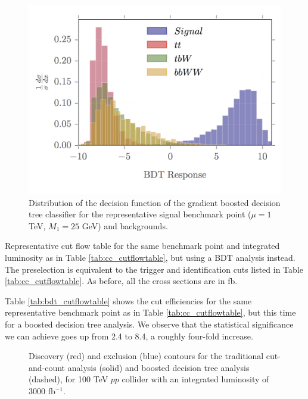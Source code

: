 \documentclass[a4paper,11pt]{article}
\begin{document}
\begin{figure}[h]
\centering
\includegraphics[trim = {0 0.5cm 0 0},clip]{images/bdt_response_png}
\caption{Distribution of the decision function of the gradient boosted decision
tree classifier for   the representative signal benchmark point ($\mu = 1$ TeV, $M_1 = 25$ GeV) and backgrounds.}
\label{fig:bdt_response}
\end{figure}

\begin{table}[h]
  \centering
  
  \caption{Representative cut flow table for the same benchmark point and
    integrated luminosity as in Table \ref{tab:cc_cutflowtable}, but using a BDT  analysis instead. The preselection is equivalent
    to the trigger and identification cuts listed in Table
    \ref{tab:cc_cutflowtable}. As before, all the cross sections are in
  fb.  }
\label{tab:bdt_cutflowtable}
\end{table}

Table \ref{tab:bdt_cutflowtable} shows the cut efficiencies for the same
representative benchmark point as in Table \ref{tab:cc_cutflowtable}, but this
time for a boosted decision tree analysis. We observe that the statistical
significance we can achieve goes up from 2.4 to 8.4, a roughly four-fold
increase.  

 


\begin{figure}[h]
\centering


\caption{ Discovery (red) and exclusion (blue) contours for the traditional
  cut-and-count analysis (solid) and boosted decision tree analysis (dashed),
  for 100 TeV $pp$ collider with an integrated luminosity of 3000 fb$^{-1}$.
}

\label{fig:contours}
\end{figure}
\end{document}

